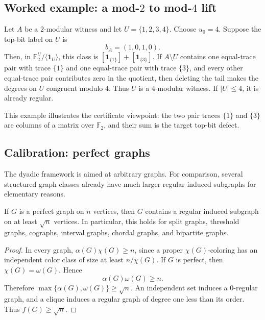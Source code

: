 \documentclass[thmsec,dntnbr,nolinenbrs]{dmgt}
\numberwithin{equation}{section}
\newcommand{\F}{\mathbb{F}}
\newcommand{\one}{\mathbf{1}}
\begin{document}
\subsection{Worked example: a mod-\(2\) to mod-\(4\) lift}

Let \(A\) be a \(2\)-modular witness and let \(U=\{1,2,3,4\}\).  Choose \(u_0=4\).  Suppose the top-bit label on \(U\) is
\[
        b_A=(1,0,1,0).
\]
Then, in \(\F_2^U/\langle \one_U\rangle\), this class is \([\one_{\{1\}}]+[\one_{\{3\}}]\).  If \(A\setminus U\) contains one equal-trace pair with trace \(\{1\}\) and one equal-trace pair with trace \(\{3\}\), and every other equal-trace pair contributes zero in the quotient, then deleting the tail makes the degrees on \(U\) congruent modulo \(4\).  Thus \(U\) is a \(4\)-modular witness.  If \(|U|\le 4\), it is already regular.

This example illustrates the certificate viewpoint: the two pair traces \(\{1\}\) and \(\{3\}\) are columns of a matrix over \(\F_2\), and their sum is the target top-bit defect.

\subsection{Calibration: perfect graphs}

The dyadic framework is aimed at arbitrary graphs.  For comparison, several structured graph classes already have much larger regular induced subgraphs for elementary reasons.

\begin{proposition}\label{prop:perfect}
If \(G\) is a perfect graph on \(n\) vertices, then \(G\) contains a regular induced subgraph on at least \(\sqrt n\) vertices.  In particular, this holds for split graphs, threshold graphs, cographs, interval graphs, chordal graphs, and bipartite graphs.
\end{proposition}

\begin{proof}
In every graph, \(\alpha(G)\chi(G)\ge n\), since a proper \(\chi(G)\)-coloring has an independent color class of size at least \(n/\chi(G)\).  If \(G\) is perfect, then \(\chi(G)=\omega(G)\).  Hence
\[
        \alpha(G)\omega(G)\ge n.
\]
Therefore \(\max\{\alpha(G),\omega(G)\}\ge \sqrt n\).  An independent set induces a \(0\)-regular graph, and a clique induces a regular graph of degree one less than its order.  Thus \(f(G)\ge \sqrt n\).
\end{proof}
\end{document}
